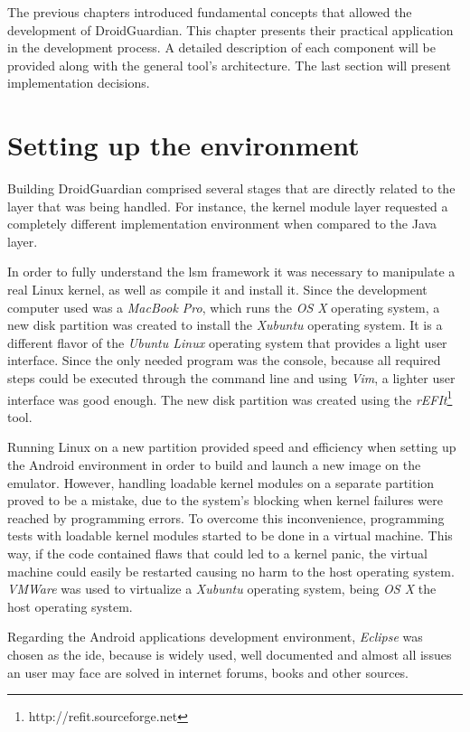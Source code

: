 The previous chapters introduced fundamental concepts that allowed the development of DroidGuardian. This chapter presents their practical application in the development process. A detailed description of each component will be provided along with the general tool's architecture. The last section will present implementation decisions.

\section{Setting up the environment}

Building DroidGuardian comprised several stages that are directly related to the layer that was being handled. For instance, the kernel module layer requested a completely different implementation environment when compared to the Java layer.

In order to fully understand the \gls{lsm} framework it was necessary to manipulate a real Linux kernel, as well as compile it and install it. Since the development computer used was a \textit{MacBook Pro}, which runs the \textit{OS X} operating system, a new disk partition was created to install the \textit{Xubuntu} operating system. It is a different flavor of the \textit{Ubuntu Linux} operating system that provides a light user interface. Since the only needed program was the console, because all required steps could be executed through the command line and using \textit{Vim}, a lighter user interface was good enough. The new disk partition was created using the \textit{rEFIt}\footnote{http://refit.sourceforge.net} tool.

Running Linux on a new partition provided speed and efficiency when setting up the Android environment in order to build and launch a new image on the emulator. However, handling loadable kernel modules on a separate partition proved to be a mistake, due to the system's blocking when kernel failures were reached by programming errors. To overcome this inconvenience, programming tests with loadable kernel modules started to be done in a virtual machine. This way, if the code contained flaws that could led to a kernel panic, the virtual machine could easily be restarted causing no harm to the host operating system. \textit{VMWare} was used to virtualize a \textit{Xubuntu} operating system, being \textit{OS X} the host operating system.

Regarding the Android applications development environment, \textit{Eclipse} was chosen as the \gls{ide}, because is widely used, well documented and almost all issues an user may face are solved in internet forums, books and other sources.

